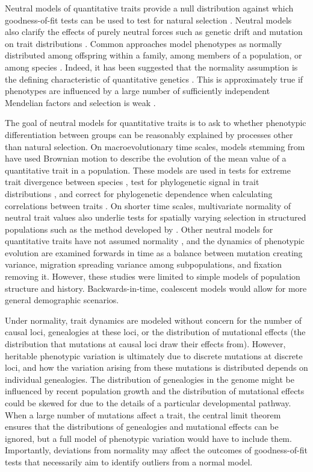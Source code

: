 Neutral models of quantitative traits provide a null distribution against which
goodness-of-fit tests can be used to test for natural
selection \citep{Lande1976,Leinonen2013}. Neutral models also clarify the
effects of purely neutral forces such as genetic drift and mutation on trait
distributions \citep{Lynch1986}. Common approaches model phenotypes as normally
distributed among offspring within a family, among members of a population, or
among species \citep{Turelli2017}. Indeed, it has been suggested that the
normality assumption is the defining characteristic of quantitative
genetics \citep{Rice2004}. This is approximately true if phenotypes are
influenced by a large number of sufficiently independent Mendelian factors
\citep{Fisher1918} and selection is weak \citep{Turelli1990}.

The goal of neutral models for quantitative traits is to ask to whether
phenotypic differentiation between groups can be reasonably explained by
processes other than natural selection. On macroevolutionary time scales, models
stemming from \citet{Lande1976} have used Brownian motion to describe the
evolution of the mean value of a quantitative trait in a population. These
models are used in tests for extreme trait divergence between
species \citep{Turelli1988}, test for phylogenetic signal in trait
distributions \citep{Freckleton2002}, and correct for phylogenetic dependence
when calculating correlations between traits \citep{Felsenstein1985}. On shorter
time scales, multivariate normality of neutral trait values also underlie tests
for spatially varying selection in structured populations such as the method
developed by \citet{Ovaskainen2011}. Other neutral models for quantitative
traits have not assumed normality \citep{Chakraborty1982,Lynch1986,Lande1992},
and the dynamics of phenotypic evolution are examined forwards in time as a
balance between mutation creating variance, migration spreading variance among
subpopulations, and fixation removing it. However, these studies were limited to
simple models of population structure and history. Backwards-in-time, coalescent
models would allow for more general demographic scenarios.

Under normality, trait dynamics are modeled without concern for the number of
causal loci, genealogies at these loci, or the distribution of mutational
effects (the distribution that mutations at causal loci draw their effects
from). However, heritable phenotypic variation is ultimately due to discrete
mutations at discrete loci, and how the variation arising from these mutations
is distributed depends on individual genealogies. The distribution of
genealogies in the genome might be influenced by recent population growth and
the distribution of mutational effects could be skewed for due to the details of
a particular developmental pathway. When a large number of mutations affect a
trait, the central limit theorem ensures that the distributions of genealogies
and mutational effects can be ignored, but a full model of phenotypic variation
would have to include them. Importantly, deviations from normality may affect
the outcomes of goodness-of-fit tests that necessarily aim to identify outliers
from a normal model.

